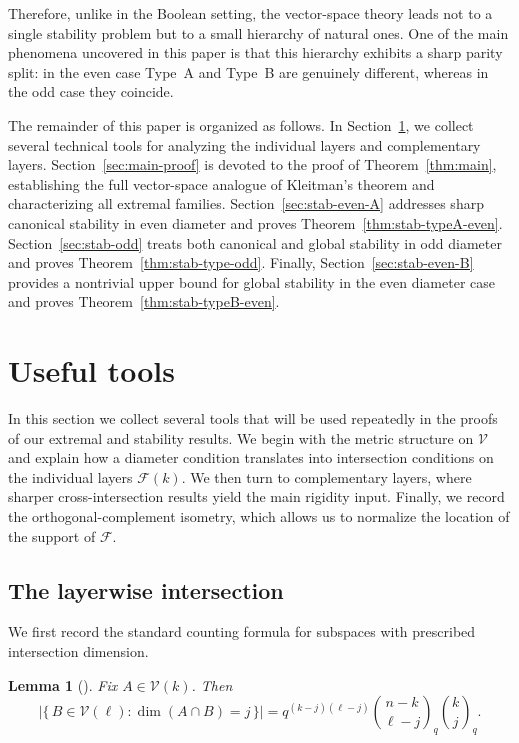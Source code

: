 \documentclass[11pt]{article}
\newtheorem{lemma}[theorem]{Lemma}
\theoremstyle{definition}
\newcommand{\qbinom}[2]{\genfrac{(}{)}{0pt}{}{#1}{#2}_q}
\begin{document}
Therefore, unlike in the Boolean setting, the vector-space theory leads not to a single stability problem but to a small hierarchy of natural ones. One of the main phenomena uncovered in this paper is that this hierarchy exhibits a sharp parity split: in the even case Type~A and Type~B are genuinely different, whereas in the odd case they coincide.


The remainder of this paper is organized as follows. In Section~\ref{sec:tools}, we collect several technical tools for analyzing the individual layers and complementary layers.
Section~\ref{sec:main-proof} is devoted to the proof of Theorem~\ref{thm:main}, establishing the full vector-space analogue of Kleitman's theorem and characterizing all extremal families.
Section~\ref{sec:stab-even-A} addresses sharp canonical stability in even diameter and proves Theorem~\ref{thm:stab-typeA-even}.
Section~\ref{sec:stab-odd} treats both canonical and global stability in odd diameter and proves Theorem~\ref{thm:stab-type-odd}.
Finally, Section~\ref{sec:stab-even-B} provides a nontrivial upper bound for  global stability in the even diameter case and proves Theorem~\ref{thm:stab-typeB-even}.


\section{Useful tools}\label{sec:tools}

In this section we collect several tools that will be used repeatedly in the proofs of our extremal and stability results. 
We begin with the metric structure on $\mathcal{V}$ and explain how a diameter condition translates into intersection conditions on the individual layers $\mathcal{F}(k)$. 
We then turn to complementary layers, where sharper cross-intersection results yield the main rigidity input. 
Finally, we record the orthogonal-complement isometry, which allows us to normalize the location of the support of $\mathcal{F}$.



\subsection{The layerwise intersection}

We first record the standard counting formula for subspaces with prescribed intersection dimension.

\begin{lemma}[\cite{GM2016}]\label{lem:subspacecounting}
Fix $A \in \mathcal{V}(k)$. Then
\[
\bigl|\{\,B \in \mathcal{V}(\ell): \dim(A \cap B) = j\,\}\bigr|
=
q^{(k-j)(\ell-j)}
\qbinom{n-k}{\ell-j}
\qbinom{k}{j}.
\]
\end{lemma}
\end{document}
